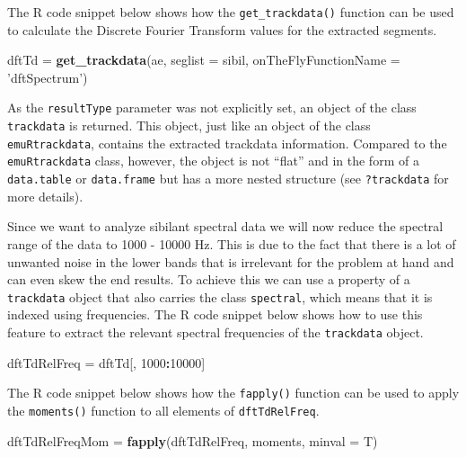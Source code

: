 \documentclass[]{book}
\newenvironment{Shaded}{\begin{snugshade}}{\end{snugshade}}
\newcommand{\DataTypeTok}[1]{\textcolor[rgb]{0.13,0.29,0.53}{#1}}
\newcommand{\DecValTok}[1]{\textcolor[rgb]{0.00,0.00,0.81}{#1}}
\newcommand{\KeywordTok}[1]{\textcolor[rgb]{0.13,0.29,0.53}{\textbf{#1}}}
\newcommand{\NormalTok}[1]{#1}
\newcommand{\OperatorTok}[1]{\textcolor[rgb]{0.81,0.36,0.00}{\textbf{#1}}}
\newcommand{\StringTok}[1]{\textcolor[rgb]{0.31,0.60,0.02}{#1}}
\theoremstyle{definition}
\theoremstyle{definition}
\theoremstyle{definition}
\theoremstyle{remark}
\begin{document}
The R code snippet below shows how the \texttt{get\_trackdata()}
function can be used to calculate the Discrete Fourier Transform values
for the extracted segments.

\begin{Shaded}
\begin{Highlighting}[]
\NormalTok{dftTd =}\StringTok{ }\KeywordTok{get_trackdata}\NormalTok{(ae,}
                      \DataTypeTok{seglist =}\NormalTok{ sibil,}
                      \DataTypeTok{onTheFlyFunctionName =} \StringTok{'dftSpectrum'}\NormalTok{)}
\end{Highlighting}
\end{Shaded}

As the \texttt{resultType} parameter was not explicitly set, an object
of the class \texttt{trackdata} is returned. This object, just like an
object of the class \texttt{emuRtrackdata}, contains the extracted
trackdata information. Compared to the \texttt{emuRtrackdata} class,
however, the object is not ``flat'' and in the form of a
\texttt{data.table} or \texttt{data.frame} but has a more nested
structure (see \texttt{?trackdata} for more details).

Since we want to analyze sibilant spectral data we will now reduce the
spectral range of the data to 1000 - 10000 Hz. This is due to the fact
that there is a lot of unwanted noise in the lower bands that is
irrelevant for the problem at hand and can even skew the end results. To
achieve this we can use a property of a \texttt{trackdata} object that
also carries the class \texttt{spectral}, which means that it is indexed
using frequencies. The R code snippet below shows how to use this
feature to extract the relevant spectral frequencies of the
\texttt{trackdata} object.

\begin{Shaded}
\begin{Highlighting}[]
\NormalTok{dftTdRelFreq =}\StringTok{ }\NormalTok{dftTd[, }\DecValTok{1000}\OperatorTok{:}\DecValTok{10000}\NormalTok{]}
\end{Highlighting}
\end{Shaded}

The R code snippet below shows how the \texttt{fapply()} function can be
used to apply the \texttt{moments()} function to all elements of
\texttt{dftTdRelFreq}.

\begin{Shaded}
\begin{Highlighting}[]
\NormalTok{dftTdRelFreqMom =}\StringTok{ }\KeywordTok{fapply}\NormalTok{(dftTdRelFreq, moments, }\DataTypeTok{minval =}\NormalTok{ T)}
\end{Highlighting}
\end{Shaded}
\end{document}
